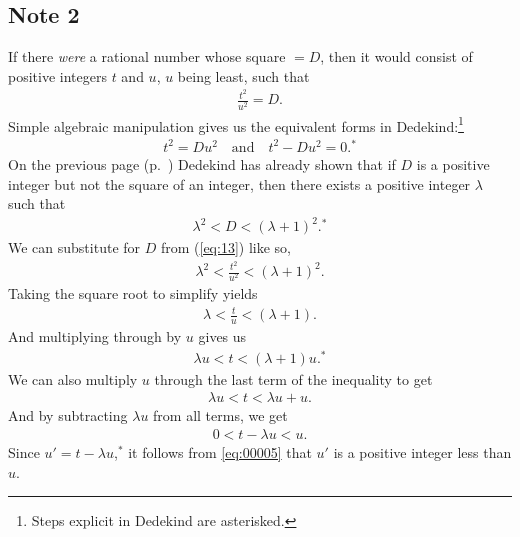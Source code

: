 \documentclass[twoside,openright]{article}
\begin{document}
\subsection*{Note 2}\label{note2}

If there \emph{were} a rational number whose square $=D$, then it
would consist of positive integers $t$ and $u$, $u$ being least, such
that
\begin{align}
  \frac{t^2}{u^2}=D.\label{eq:13}
\end{align}
Simple algebraic manipulation gives us the equivalent forms in
Dedekind:\footnote{Steps explicit in Dedekind are asterisked.}
\begin{align}
  \label{eq:14}
  t^2=Du^2 \quad \mathrm{and} \quad t^2-Du^2=0.^* 
\end{align}
On the previous page (p.~\pageref{DposNotSq}) Dedekind has already
shown that if $D$ is a positive integer but not the square of an
integer, then there exists a positive integer $\lambda$ such that
\begin{align}
  \label{eq:1}
  \lambda^2<D<(\lambda + 1)^2.^*
\end{align}
We can substitute for $D$ from (\ref{eq:13}) like
so,
\begin{align}
\label{eq:2}
  \lambda^2 < \frac{t^2}{u^2} < (\lambda + 1)^2.
\end{align}
Taking the square root to simplify yields
\begin{align}
\label{eq:3}
  \lambda < \frac{t}{u} < (\lambda + 1).
\end{align}
And multiplying through by $u$ gives us
\begin{align}
\label{eq:4}
  \lambda u < t < (\lambda + 1)u.^*
\end{align}
We can also multiply $u$ through the last term of the inequality
to get
\begin{align}
\label{eq:5}
 \lambda u < t < \lambda u + u. 
\end{align}
And by subtracting $\lambda u$ from all terms, we get
\begin{align}
  \label{eq:00005}
  0<t-\lambda u<u.
\end{align}
Since $u'=t-\lambda u$,$^*$ it follows from
\eqref{eq:00005} that $u'$ is a positive integer less than
$u$.
\end{document}
